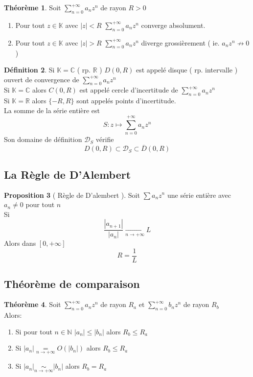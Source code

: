 \documentclass[10pt,a4paper]{article}
\theoremstyle{definition}
\newtheorem{proposition}{Proposition}[section]
\newtheorem{theorem}[proposition]{Théorème}
\newtheorem{definition}[proposition]{Définition}
\begin{document}
\begin{theorem}
    Soit \(\sum\limits_{n = 0}^{+\infty} a_n z^n\) de rayon \(R > 0\)
    \begin{enumerate}
        \item Pour tout \(z \in \mathbb{K}\) avec \(|z|< R\) \(\sum\limits_{n = 0}^{+\infty} a_n z^n\) converge absolument.
        \item Pour tout \(z \in \mathbb{K}\) avec \(|z|> R\) \(\sum\limits_{n = 0}^{+\infty} a_n z^n\) diverge grossièrement ( ie. \(a_n z^n \not\to 0\) )
    \end{enumerate}
\end{theorem}
\begin{definition}
    Si \(\mathbb{K} = \mathbb{C}\) ( rp. \(\mathbb{R}\) ) \(D(0, R)\) est appelé disque ( rp. intervalle ) ouvert
    de convergence de \(\sum\limits_{n = 0}^{+\infty} a_n z^n\) \\
    Si \(\mathbb{K} = \mathbb{C}\) alors \(C(0, R)\) est appelé cercle d'incertitude de \(\sum\limits_{n = 0}^{+\infty} a_n z^n\) \\
    Si \(\mathbb{K} = \mathbb{R}\) alors \(\{-R, R\}\) sont appelés points d'incertitude. \\
    La somme de la série entière est
    \[S: z \mapsto \sum\limits_{n = 0}^{+\infty} a_n z^n\]
    Son domaine de définition \(\mathcal{D}_S\) vérifie
    \[D(0, R) \subset \mathcal{D}_S \subset \overline{D}(0, R)\]
\end{definition}

\subsection{La Règle de D'Alembert}
\begin{proposition}[ Règle de D'alembert ]
    Soit \(\sum a_n z^n\) une série entière avec \(a_n \neq 0\) pour tout \(n\) \\
    Si \[\frac{|a_{n + 1}|}{|a_n|} \xrightarrow[n \to +\infty]{} L\]
    Alors dans \([0, +\infty]\)
    \[R = \frac{1}{L}\]
\end{proposition}

\subsection{Théorème de comparaison}
\begin{theorem}
    Soit \(\sum\limits_{n = 0}^{+\infty} a_n z^n\) de rayon \(R_a\) et \(\sum\limits_{n = 0}^{+\infty} b_n z^n\) de rayon \(R_b\) \\
    Alors:
    \begin{enumerate}
        \item Si pour tout \(n \in \mathbb{N}\) \(|a_n| \leq |b_n|\) alors \(R_b \leq R_a\)
        \item Si \(|a_n| \underset{n \to +\infty}{=} O(|b_n|)\) alors \(R_b \leq R_a\)
        \item Si \(|a_n| \underset{n \to +\infty}{\sim} |b_n|\) alors \(R_b = R_a\)
    \end{enumerate}
\end{theorem}
\end{document}

